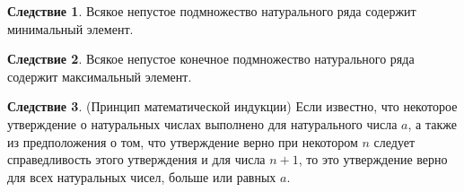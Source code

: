 \documentclass[a4paper, 12pt]{article}
\theoremstyle{definition}
\newtheorem{cons}{Следствие}
\begin{document}
    \begin{cons}
        Всякое непустое подмножество натурального ряда содержит минимальный элемент.
    \end{cons}
    \begin{cons}
        Всякое непустое конечное подмножество натурального ряда содержит максимальный элемент.
    \end{cons}
    \begin{cons} (Принцип математической индукции)\newline
        Если известно, что некоторое утверждение о натуральных числах выполнено для натурального числа $a$, а также из предположения о том, что утверждение верно при некотором $n$ следует справедливость этого утверждения и для числа $n+1$, то это утверждение верно для всех натуральных чисел, больше или равных $a$.
    \end{cons}
\end{document}
